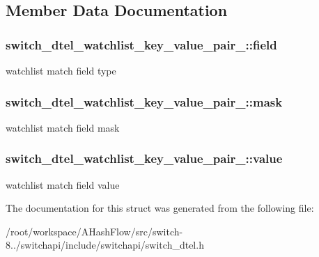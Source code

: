 \subsection{Member Data Documentation}
\hypertarget{structswitch__dtel__watchlist__key__value__pair___a4ec05f57ff36f1695f514508e28b813d}{
\subsubsection[{field}]{ switch\+\_\+dtel\+\_\+watchlist\+\_\+key\+\_\+value\+\_\+pair\+\_\+\+::field}}\label{structswitch__dtel__watchlist__key__value__pair___a4ec05f57ff36f1695f514508e28b813d}
watchlist match field type \hypertarget{structswitch__dtel__watchlist__key__value__pair___a33dc1da79e1161623ea071b1dbeceadd}{
\subsubsection[{mask}]{ switch\+\_\+dtel\+\_\+watchlist\+\_\+key\+\_\+value\+\_\+pair\+\_\+\+::mask}}\label{structswitch__dtel__watchlist__key__value__pair___a33dc1da79e1161623ea071b1dbeceadd}
watchlist match field mask \hypertarget{structswitch__dtel__watchlist__key__value__pair___a2c8704e498f58182e775905d53c06c2f}{
\subsubsection[{value}]{ switch\+\_\+dtel\+\_\+watchlist\+\_\+key\+\_\+value\+\_\+pair\+\_\+\+::value}}\label{structswitch__dtel__watchlist__key__value__pair___a2c8704e498f58182e775905d53c06c2f}
watchlist match field value 

The documentation for this struct was generated from the following file\+:\begin{DoxyCompactItemize}
\item 
/root/workspace/\+A\+Hash\+Flow/src/switch-\/8../switchapi/include/switchapi/switch\+\_\+dtel.\+h\end{DoxyCompactItemize}
